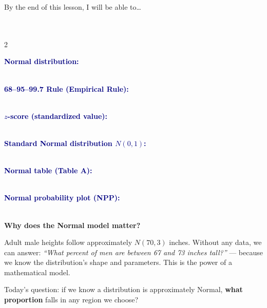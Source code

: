 \documentclass[10pt]{article}
\newcommand{\vocabterm}[1]{%
  \par\noindent\textbf{\textcolor{navy}{#1:}}\\[1pt]%
  \writeline\\[1pt]\writeline\par\vspace{3pt}}
\begin{document}

\vspace{0.10in}

\begin{objectivebox}
\small By the end of this lesson, I will be able to\dots\\[4pt]
\writeline\\[1pt]
\writeline\\[1pt]
\writeline
\end{objectivebox}

\vspace{0.10in}

\boxguard
\begin{vocabbox}
\small
\begin{multicols}{2}
\vocabterm{Normal distribution}
\vocabterm{68--95--99.7 Rule (Empirical Rule)}
\vocabterm{$z$-score (standardized value)}
\columnbreak
\vocabterm{Standard Normal distribution $N(0,1)$}
\vocabterm{Normal table (Table A)}
\vocabterm{Normal probability plot (NPP)}
\end{multicols}
\end{vocabbox}

\vspace{0.10in}

\boxguard
\begin{hookbox}
\small\textbf{Why does the Normal model matter?}

\vspace{5pt}
Adult male heights follow approximately $N(70, 3)$ inches. Without any data, we can
answer: \textit{``What percent of men are between 67 and 73 inches tall?''} --- because
we know the distribution's shape and parameters. This is the power of a mathematical model.

\vspace{4pt}
Today's question: if we know a distribution is approximately Normal,
\textbf{what proportion} falls in any region we choose?
\end{hookbox}

\vspace{0.08in}
\end{document}

